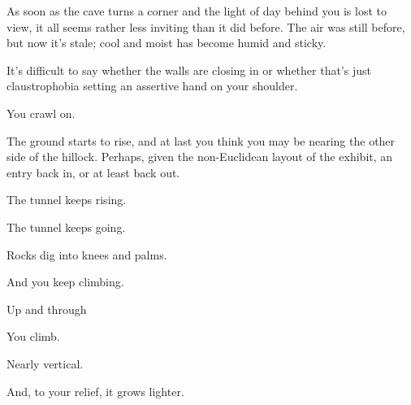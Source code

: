 As soon as the cave turns a corner and the light of day behind you is lost to view, it all seems rather less inviting than it did before. The air was still before, but now it's stale; cool and moist has become humid and sticky.

It's difficult to say whether the walls are closing in or whether that's just claustrophobia setting an assertive hand on your shoulder.

You crawl on.

The ground starts to rise, and at last you think you may be nearing the other side of the hillock. Perhaps, given the non-Euclidean layout of the exhibit, an entry back in, or at least back out.

\newpage

\null
\vfill

The tunnel keeps rising.

\newpage

\null
\vfill

The tunnel keeps going.

\vspace{1in}

\newpage

\null
\vfill

Rocks dig into knees and palms.

\null
\vspace{1.5in}

\newpage

\null
\vfill

And you keep climbing.

\null
\vspace{2in}

\newpage

\null
\vfill

Up and through

\null
\vfill

\newpage

\newpage

\null
\vspace{2in}

You climb.

\newpage

\null
\vspace{1.5in}

Nearly vertical.

\newpage

\null
\vspace{1in}

And, to your relief, it grows lighter.

